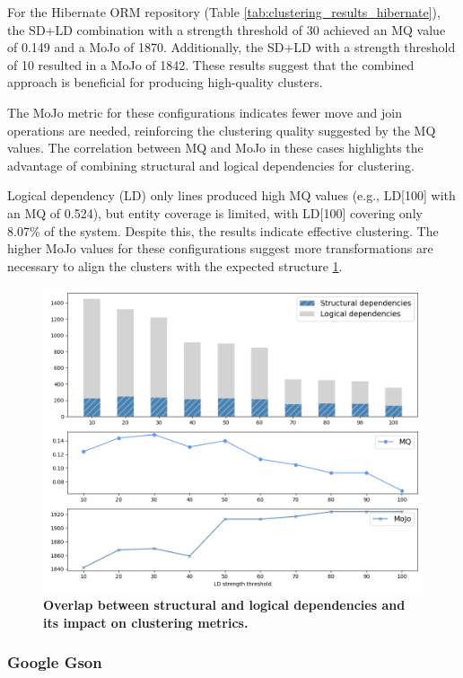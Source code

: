 \documentclass{ieeeaccess}
\begin{document}
For the Hibernate ORM repository (Table \ref{tab:clustering_results_hibernate}), the SD+LD combination with a strength threshold of 30 achieved an MQ value of 0.149 and a MoJo of 1870. Additionally, the SD+LD with a strength threshold of 10 resulted in a MoJo of 1842. These results suggest that the combined approach is beneficial for producing high-quality clusters.

The MoJo metric for these configurations indicates fewer move and join operations are needed, reinforcing the clustering quality suggested by the MQ values. The correlation between MQ and MoJo in these cases highlights the advantage of combining structural and logical dependencies for clustering.

Logical dependency (LD) only lines produced high MQ values (e.g., LD[100] with an MQ of 0.524), but entity coverage is limited, with LD[100] covering only 8.07\% of the system. Despite this, the results indicate effective clustering. The higher MoJo values for these configurations suggest more transformations are necessary to align the clusters with the expected structure  \ref{fig:hibernate_correlation}.

\begin{figure}[t!]
  \centering
  \includegraphics[width=\columnwidth]{hibernate_correlation.png}
  \caption{\textbf{Overlap between structural and logical dependencies and its impact on clustering metrics.}}
  \label{fig:hibernate_correlation}
\end{figure}

\subsubsection{Google Gson}
\end{document}
